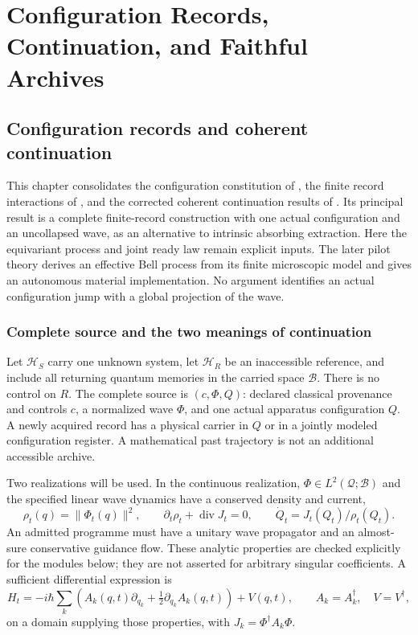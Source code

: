 \documentclass[11pt,oneside,openany]{book}
\theoremstyle{definition}
\theoremstyle{remark}\newtheorem{remark}[theorem]{Remark}
\begin{document}
\part{Configuration Records, Continuation, and Faithful Archives}\label{part:records}

\chapter{Configuration records and coherent continuation}
\label{cfg:chapter}

This chapter consolidates the configuration constitution of \cite{M18},
the finite record interactions of \cite{M30}, and the corrected coherent
continuation results of \cite{C02}. Its principal result is a complete
finite-record construction with one actual configuration and an uncollapsed
wave, as an alternative to intrinsic absorbing extraction. Here the
equivariant process and joint ready law remain explicit inputs. The later
pilot theory derives an effective Bell process from its finite microscopic
model and gives an autonomous material implementation. No argument
identifies an actual configuration jump with a global projection of the wave.

\section{Complete source and the two meanings of continuation}

Let $\mathcal H_S$ carry one unknown system, let $\mathcal H_R$ be an
inaccessible reference, and include all returning quantum memories in the
carried space $\mathcal B$. There is no control on $R$. The complete source is
$(c,\Phi,Q)$: declared classical provenance and controls $c$, a normalized
wave $\Phi$, and one actual apparatus configuration $Q$. A newly acquired
record has a physical carrier in $Q$ or in a jointly modeled configuration
register. A mathematical past trajectory is not an additional accessible
archive.

Two realizations will be used. In the continuous realization,
$\Phi\in L^2(\mathcal Q;\mathcal B)$ and the specified linear wave dynamics
have a conserved density and current,
\begin{equation}
 \rho_t(q)=\|\Phi_t(q)\|^2,\qquad
 \partial_t\rho_t+\operatorname{div}J_t=0,\qquad
 \dot Q_t=J_t(Q_t)/\rho_t(Q_t).
 \label{cfg:guidance}
\end{equation}
An admitted programme must have a unitary wave propagator and an almost-sure
conservative guidance flow. These analytic properties are checked explicitly
for the modules below; they are not asserted for arbitrary singular
coefficients. A sufficient differential expression is
\[
 H_t=-i\hbar\sum_k\left(A_k(q,t)\partial_{q_k}
             +\tfrac12\partial_{q_k}A_k(q,t)\right)+V(q,t),
 \qquad A_k=A_k^\dagger,\quad V=V^\dagger,
\]
on a domain supplying those properties, with $J_k=\Phi^\dagger A_k\Phi$.
\end{document}
